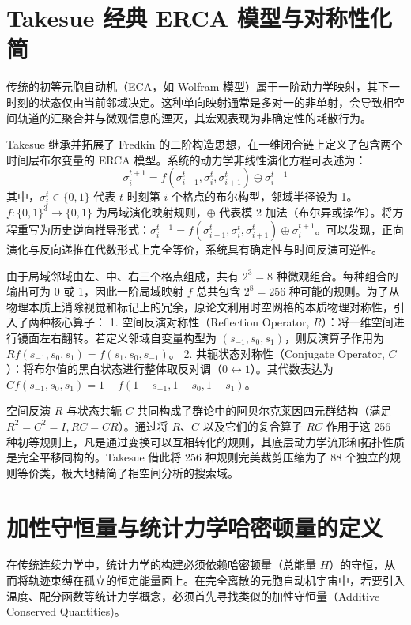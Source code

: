 \documentclass[reprint, amsmath, amssymb, aps, physrev,prb]{revtex4-2}
\begin{document}
\section{Takesue 经典 ERCA 模型与对称性化简}

传统的初等元胞自动机（ECA，如 Wolfram \cite{wolfram} 模型）属于一阶动力学映射，其下一时刻的状态仅由当前邻域决定。这种单向映射通常是多对一的非单射，会导致相空间轨道的汇聚合并与微观信息的湮灭，其宏观表现为非确定性的耗散行为。

Takesue 继承并拓展了 Fredkin \cite{VICHNIAC198496} 的二阶构造思想，在一维闭合链上定义了包含两个时间层布尔变量的 ERCA 模型。系统的动力学非线性演化方程可表述为：
\begin{equation}
\sigma_{i}^{t+1} = f(\sigma_{i-1}^{t}, \sigma_{i}^{t}, \sigma_{i+1}^{t}) \oplus \sigma_{i}^{t-1}
\end{equation}
其中，$\sigma_{i}^{t} \in \{0, 1\}$ 代表 $t$ 时刻第 $i$ 个格点的布尔构型，邻域半径设为 1。$f: \{0,1\}^3 \to \{0,1\}$ 为局域演化映射规则，$\oplus$ 代表模 2 加法（布尔异或操作）。将方程重写为历史逆向推导形式：$\sigma_{i}^{t-1} = f(\sigma_{i-1}^{t}, \sigma_{i}^{t}, \sigma_{i+1}^{t}) \oplus \sigma_{i}^{t+1}$。可以发现，正向演化与反向递推在代数形式上完全等价，系统具有确定性与时间反演可逆性。

由于局域邻域由左、中、右三个格点组成，共有 $2^3 = 8$ 种微观组合。每种组合的输出可为 0 或 1，因此一阶局域映射 $f$ 总共包含 $2^8 = 256$ 种可能的规则。为了从物理本质上消除视觉和标记上的冗余，原论文利用时空网格的本质物理对称性，引入了两种核心算子：
1. 空间反演对称性（Reflection Operator, $R$）：将一维空间进行镜面左右翻转。若定义邻域自变量构型为 $(s_{-1}, s_0, s_1)$，则反演算子作用为 $Rf(s_{-1}, s_0, s_1) = f(s_1, s_0, s_{-1})$。
2. 共轭状态对称性（Conjugate Operator, $C$）：将布尔值的黑白状态进行整体取反对调（$0 \leftrightarrow 1$）。其代数表达为 $Cf(s_{-1}, s_0, s_1) = 1 - f(1-s_{-1}, 1-s_0, 1-s_1)$。

空间反演 $R$ 与状态共轭 $C$ 共同构成了群论中的阿贝尔克莱因四元群结构（满足 $R^2 = C^2 = I, RC = CR$）。通过将 $R$、$C$ 以及它们的复合算子 $RC$ 作用于这 256 种初等规则上，凡是通过变换可以互相转化的规则，其底层动力学流形和拓扑性质是完全平移同构的。Takesue 借此将 256 种规则完美裁剪压缩为了 88 个独立的规则等价类，极大地精简了相空间分析的搜索域。

\section{加性守恒量与统计力学哈密顿量的定义}

在传统连续力学中，统计力学的构建必须依赖哈密顿量（总能量 $H$）的守恒，从而将轨迹束缚在孤立的恒定能量面上。在完全离散的元胞自动机宇宙中，若要引入温度、配分函数等统计力学概念，必须首先寻找类似的加性守恒量（Additive Conserved Quantities)。
\end{document}
